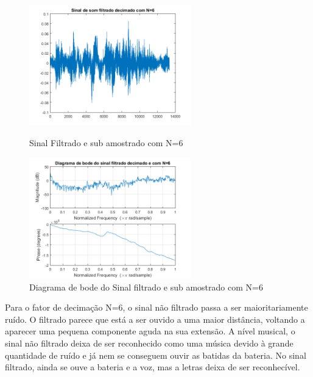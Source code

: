 \documentclass[11pt]{article}
\begin{document}
\newpage
\begin{figure}[h]
\begin{center}
\begin{minipage}[b]{0.45\linewidth}
\includegraphics[width=7cm]{fds6.png}
\caption{Sinal Filtrado e sub amostrado com N=6}
\label{figura11}
\end{minipage}
\begin{minipage}[b]{0.45\linewidth}
\includegraphics[width=7cm]{fdb6.png}
\caption{Diagrama de bode do Sinal filtrado e sub amostrado com N=6}
\label{figura}
\end{minipage}
\end{center}
\end{figure}
Para o fator de decimação N=6, o sinal não filtrado passa a ser maioritariamente ruído. O filtrado parece que está a ser ouvido a uma maior distância, voltando a aparecer uma pequena componente aguda na sua extensão. A nível musical,  o sinal não filtrado deixa de ser reconhecido como uma música devido à grande quantidade de ruído e já nem se conseguem ouvir as batidas da bateria. No sinal filtrado, ainda se ouve a bateria e a voz, mas a letras deixa de ser reconhecível.

\newpage
\end{document}
